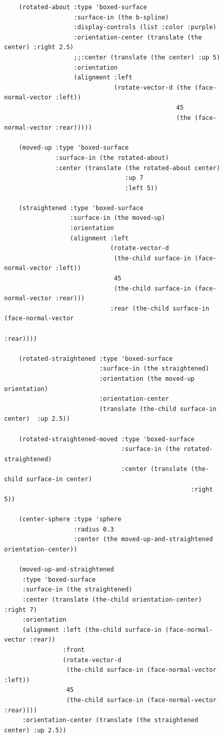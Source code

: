 \documentclass [11pt]{book}
\begin{document}
\begin{itemize}
\begin{figure}
\begin{lrbox}{\boxedverb}
\begin{minipage}{\linewidth}
{\begin{verbatim}
    (rotated-about :type 'boxed-surface
                   :surface-in (the b-spline)
                   :display-controls (list :color :purple)
                   :orientation-center (translate (the center) :right 2.5)
                   ;;:center (translate (the center) :up 5)
                   :orientation 
                   (alignment :left 
                              (rotate-vector-d (the (face-normal-vector :left))
                                               45
                                               (the (face-normal-vector :rear)))))
    
    (moved-up :type 'boxed-surface
              :surface-in (the rotated-about)
              :center (translate (the rotated-about center) 
                                 :up 7
                                 :left 5))
   
    (straightened :type 'boxed-surface
                  :surface-in (the moved-up)
                  :orientation 
                  (alignment :left 
                             (rotate-vector-d 
                              (the-child surface-in (face-normal-vector :left))
                              45
                              (the-child surface-in (face-normal-vector :rear)))
                             :rear (the-child surface-in (face-normal-vector 
                                                          :rear))))

    (rotated-straightened :type 'boxed-surface
                          :surface-in (the straightened)
                          :orientation (the moved-up orientation)
                          :orientation-center 
                          (translate (the-child surface-in center)  :up 2.5))
  
    (rotated-straightened-moved :type 'boxed-surface
                                :surface-in (the rotated-straightened)
                                :center (translate (the-child surface-in center)
                                                   :right 5))

    (center-sphere :type 'sphere 
                   :radius 0.3 
                   :center (the moved-up-and-straightened orientation-center))
      
    (moved-up-and-straightened 
     :type 'boxed-surface
     :surface-in (the straightened)
     :center (translate (the-child orientation-center) :right 7)
     :orientation 
     (alignment :left (the-child surface-in (face-normal-vector :rear))
                :front
                (rotate-vector-d 
                 (the-child surface-in (face-normal-vector :left))
                 45
                 (the-child surface-in (face-normal-vector :rear))))
     :orientation-center (translate (the straightened center) :up 2.5))
 

\end{verbatim}}
\end{minipage}
\end{lrbox}
\end{figure}
\end{itemize}
\end{document}
